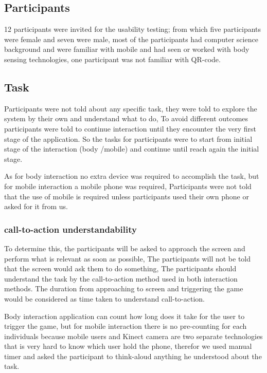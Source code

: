 \subsection {Participants}
12 participants were invited for the usability testing; from which five participants were female and seven were male, most of the participants had computer science background and were familiar with mobile and had seen or worked with body sensing technologies, one participant was not familiar with QR-code.

\subsection{Task}
Participants were not told about any specific task, they were told to explore the system by their own and understand what to do, To avoid different outcomes participants were told to continue interaction until they encounter the very first stage of the application. So the tasks for participants were to start from initial stage of the interaction (body /mobile) and continue until reach again the initial stage.

As for body interaction no extra device was required to accomplish the task, but for mobile interaction a mobile phone was required, Participants were not told that the use of mobile is required unless participants used their own phone or asked for it from us.

\subsubsection{call-to-action understandability}
To determine this, the participants will be asked to approach the screen and perform what is relevant as soon as possible, The participants will not be told that the screen would ask them to do something, The participants should understand the task by the call-to-action method used in both interaction methods. The duration from approaching to screen and triggering the game would be considered as time taken to understand call-to-action. 

Body interaction application can count how long does it take for the user to trigger the game, but for mobile interaction there is no pre-counting for each individuals because mobile users and Kinect camera are two separate technologies that is very hard to know which user hold the phone, therefor we used manual timer and asked the participant to think-aloud anything he understood about the task.

